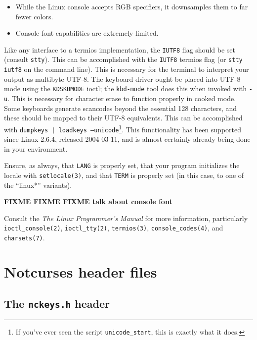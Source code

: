 \documentclass[letterpaper,10pt]{article}
\newenvironment{denseitemize}{
  \begin{itemize}
      \setlength{\itemsep}{0pt}
}{
  \end{itemize}
}
\begin{document}
\begin{appendices}
\begin{denseitemize}
\item{While the Linux console accepts RGB specifiers, it downsamples them to
    far fewer colors.}
\item{Console font capabilities are extremely limited.}
\end{denseitemize}

Like any interface to a termios\cite{termios} implementation, the \texttt{IUTF8}
flag should be set (consult \texttt{stty}). This can be accomplished with the
\texttt{IUTF8} termios flag (or \texttt{stty iutf8} on the command line). This
is necessary for the terminal to interpret your output as multibyte UTF-8. The
keyboard driver ought be placed into UTF-8 mode using the \texttt{KDSKBMODE}
ioctl; the \texttt{kbd-mode} tool does this when invoked with \texttt{-u}.
This is necessary for character erase to function properly in cooked mode. Some
keyboards generate scancodes beyond the essential 128 characters, and these
should be mapped to their UTF-8 equivalents. This can be accomplished with
\texttt{dumpkeys | loadkeys --unicode}\footnote{If you've ever seen the script
\texttt{unicode\_start}, this is exactly what it does.}. This functionality has
been supported since Linux 2.6.4, released 2004-03-11, and is almost certainly
already being done in your environment.

Ensure, as always, that \texttt{LANG} is properly set, that your program
initializes the locale with \texttt{setlocale(3)}, and that \texttt{TERM} is
properly set (in this case, to one of the ``linux*'' variants).

\textbf{FIXME FIXME FIXME talk about console font}

Consult the \textit{The Linux Programmer's Manual} for more information,
particularly
\texttt{ioctl\_console(2)}\cite{ioctlconsole},
\texttt{ioctl\_tty(2)}\cite{ioctltty},
\texttt{termios(3)}\cite{termios},
\texttt{console\_codes(4)}\cite{consolecodes},
and
\texttt{charsets(7)}\cite{charsets7}.

\newpage

\section{Notcurses header files}

\subsection{The \texttt{nckeys.h} header}

\end{appendices}
\end{document}
